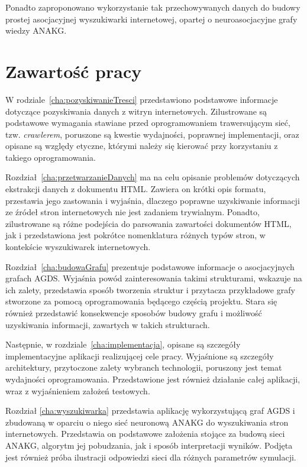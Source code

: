 Ponadto zaproponowano wykorzystanie tak przechowywanych danych do budowy prostej asocjacyjnej wyszukiwarki internetowej, opartej o neuroasocjacyjne grafy wiedzy ANAKG\cite[s. 223-244]{Horzyk}. 



\section{Zawartość pracy}
\label{sec:zawartoscPracy}

W rodziale~\ref{cha:pozyskiwanieTresci} przedstawiono podstawowe informacje dotyczące pozyskiwania danych z witryn internetowych. Zilustrowane są podstawowe wymagania stawiane przed oprogramowaniem trawersującym sieć, tzw. \emph{crawlerem}, poruszone są kwestie wydajności, poprawnej implementacji, oraz opisane są względy etyczne, którymi należy się kierować przy korzystaniu z takiego oprogramowania.

Rozdział~\ref{cha:przetwarzanieDanych} ma na celu opisanie problemów dotyczących ekstrakcji danych z dokumentu HTML. Zawiera on krótki opis formatu, przestawia jego zastowania i wyjaśnia, dlaczego poprawne uzyskiwanie informacji ze źródeł stron internetowych nie jest zadaniem trywialnym. Ponadto, zilustrowane są różne podejścia do parsowania zawartości dokumentów HTML, jak i przedstawiona jest pokrótce nomenklatura różnych typów stron, w kontekście wyszukiwarek internetowych.

Rozdział~\ref{cha:budowaGrafu} prezentuje podstawowe informacje o asocjacyjnych grafach AGDS. Wyjaśnia powód zainteresowania takimi strukturami, wskazuje na ich zalety, przedstawia sposób tworzenia struktur i przytacza przykładowe grafy stworzone za pomocą oprogramowania będącego częścią projektu. Stara się również przedstawić konsekwencje sposobów budowy grafu i możliwość uzyskiwania informacji, zawartych w takich strukturach.

Następnie, w rozdziale~\ref{cha:implementacja}, opisane są szczegóły implementacyjne aplikacji realizującej cele pracy. Wyjaśnione są szczegóły architektury, przytoczone zalety wybranch technologii, poruszony jest temat wydajności oprogramowania. Przedstawione jest również działanie całej aplikacji, wraz z wyjaśnieniem założeń testowych.

Rozdział \ref{cha:wyszukiwarka} przedstawia aplikację wykorzystującą graf AGDS i zbudowaną w oparciu o niego sieć neuronową ANAKG do wyszukiwania stron internetowych. Przedstawia on podstawowe założenia stojące za budową sieci ANAKG, algorytm jej pobudzania, jak i sposób interpretacji wyników. Podjęta jest również próba ilustracji odpowiedzi sieci dla różnych parametrów symulacji.


















